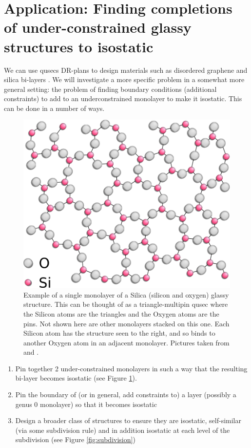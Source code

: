 \section{Application: Finding completions of under-constrained glassy structures to isostatic}
\label{sec:bodypin}
% 

We can use qusecs DR-plans to design materials such as disordered
graphene and silica bi-layers \cite{silica_bilayers}
\cite{sructure_of_2d_glass}. We will investigate a more specific problem in
a somewhat more general setting:
the problem of finding boundary conditions (additional constraints) to
add to an underconstrained monolayer to make it
isostatic.
This can be done in a number of ways.

\begin{figure}\centering
    \includegraphics[width=0.4\linewidth]{img/Silica} \hspace{0.5cm}
    \caption{Example of a single monolayer of a Silica (silicon and oxygen)
    glassy structure. This can be thought of as a triangle-multipin qusec
where the Silicon atoms are the triangles and the Oxygen atoms are the pins.
Not shown here are other monolayers stacked on this one. Each Silicon atom
has the structure seen to the right, and so binds to another Oxygen atom in
an adjacent monolayer. Pictures taken from \cite{silica_figure} and \cite{tetra_silica_figure}.}
    \label{fig:silica_glass}
\end{figure}

\begin{enumerate}
    \item Pin together 2 under-constrained monolayers in such a way that the resulting bi-layer becomes isostatic (see Figure \ref{fig:silica_glass}).
    \item Pin the boundary of (or in general, add constraints to) a layer
        (possibly a genus 0 monolayer) so that it becomes isostatic
    \item Design a broader class of structures to ensure they are isostatic,
        self-similar (via some subdivision rule) and in addition isostatic at each
        level of the subdivision (see Figure \ref{fig:subdivision})
\end{enumerate}

